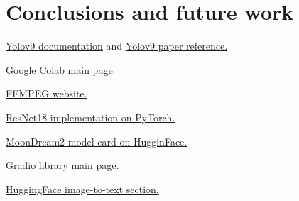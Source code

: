 \documentclass[conference]{IEEEtran}
\begin{document}
\section{Conclusions and future work}


\begin{thebibliography}{00}

        \href{https://docs.ultralytics.com/models/yolov9/}{Yolov9 documentation} and 
        \href{https://docs.ultralytics.com/models/yolov9/\#citations-and-acknowledgements}{Yolov9 paper reference.}
    
        \href{https://colab.research.google.com/}{Google Colab main page.}

        \href{https://ffmpeg.org}{FFMPEG website.}
    
        \href{https://pytorch.org/vision/main/models/generated/torchvision.models.resnet18.html}{ResNet18 implementation on PyTorch.}
    
        \href{https://huggingface.co/vikhyatk/moondream2}{MoonDream2 model card on HugginFace.}
    
        \href{https://www.gradio.app/}{Gradio library main page.}

     \href{https://huggingface.co/models?pipeline_tag=image-to-text&sort=trending}{HuggingFace image-to-text section.}

\end{thebibliography}
\end{document}
